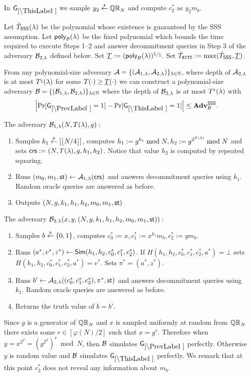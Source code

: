 In $\games_\thisgame$ we sample $y_2 \stackrel{{\scriptscriptstyle\$}}{\leftarrow} \mathbb{QR}_N$ and compute $c_2^*$ as $y_2 m_b$.

Let $\tilde{T}_\mathsf{SSS}(\lambda)$ be the polynomial whose existence is guaranteed by the SSS assumption.
Let $\mathsf{poly}_{\mathcal{B}}(\lambda)$ be the fixed polynomial which bounds the time required to execute Steps 1--2 and answer decommitment queries in Step 3 of the adversary $\mathcal{B}_{2, \lambda}$ defined below. Set $\underline{T} := (\mathsf{poly}_{\mathcal{B}}(\lambda))^{1 / \underline{\epsilon}}$.  Set $\tilde{T}_{\mathtt{NITC}} := \max(\tilde{T}_\mathsf{SSS}, \underline{T})$.
\begin{lemma}
From any polynomial-size adversary $\mathcal{A} = \{(\mathcal{A}_{1,\lambda}, \mathcal{A}_{2, \lambda})\}_{\lambda \in \mathbb{N}}$, where depth of $\mathcal{A}_{2, \lambda}$ is at most $T^{\underline{\epsilon}}(\lambda)$ for some $T(\cdot) \geq \underline{T}(\cdot)$ we can construct a polynomial-size adversary $\mathcal{B} = \{(\mathcal{B}_{1,\lambda}, \mathcal{B}_{2, \lambda})\}_{\lambda \in \mathbb{N}}$ where the depth of $\mathcal{B}_{2, \lambda}$ is at most $T^{\epsilon}(\lambda)$ with
\[
\left|\Pr[\games_\prevgame = 1] - \Pr[\games_\thisgame = 1]\right| \leq \advtg_\advB^\sss.
\]
\end{lemma}

The adversary $\mathcal{B}_{1,\lambda}(N, T(\lambda), g):$
\vspace{-2mm}
\begin{enumerate}
\item Samples $k_1 \stackrel{{\scriptscriptstyle\$}}{\leftarrow} [\left\lfloor N/4 \right\rfloor]$, computes $h_1 := g^{k_1} \bmod N, h_2 := g^{2^{T(\lambda)}} \bmod N$ and sets $\mathsf{crs}:=(N, T(\lambda), g, h_1, h_2)$. Notice that value $h_2$ is computed by repeated squaring.
\item Runs $(m_0, m_1, \mathsf{st}) \leftarrow \mathcal{A}_{1, \lambda}(\mathsf{crs})$ and answers decommitment queries using $k_1$. Random oracle queries are answered as before. 
\item Outputs $(N,g,k_1, h_1,h_2, m_0, m_1, \mathsf{st})$
\end{enumerate}

The adversary $\mathcal{B}_{2,\lambda}(x,y,(N,g,k_1, h_1,h_2, m_0, m_1, \mathsf{st})):$
\vspace{-2mm}
\begin{enumerate}
\item Samples $b \stackrel{{\scriptscriptstyle\$}}{\leftarrow} \{0,1\}$, computes $c_0^*:=x, c_1^*:=x^{k_1} m_b, c_2^*:=y m_b$.
\item Runs $(a^*,v^*,z^*) \leftarrow \mathsf{Sim}(h_1, h_2, c_0^*, c_1^*, c_2^*)$. If $H(h_1, h_2, c_0^*, c_1^*, c_2^*,a^*) = \bot$ sets $H(h_1, h_2, c_0^*, c_1^*, c_2^*,a^*) = v^*$. Sets $\pi^* = (a^*,z^*)$.
\item Runs $b' \leftarrow \mathcal{A}_{2, \lambda}((c_0^*, c_1^*, c_2^*), \pi^*, \mathsf{st})$ and answers decommitment queries using $k_1$. Random oracle queries are answered as before. 
\item Returns the truth value of $b=b'$.
\end{enumerate}
Since $g$ is a generator of $\mathbb{QR}_N$ and $x$ is sampled uniformly at random from $\mathbb{QR}_N$ there exists some $r \in [\varphi(N)/2]$ such that $x = g^{r}$. Therefore when $y = x^{2^T} = (g^{2^T})^{r} \bmod N$, then $\mathcal{B}$ simulates $\games_\prevgame$ perfectly. Otherwise $y$ is random value and $\mathcal{B}$ simulates $\games_\thisgame$ perfectly. We remark that at this point $c_2^*$ does not reveal any information about $m_b$.

